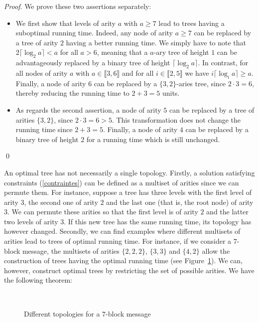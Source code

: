 \documentclass{llncs}
\renewenvironment{proof}{\paragraph{Proof} }{\hfill\qed}
\renewcommand{\paragraph}[1]{\noindent\textit{#1}.}
\begin{document}
\begin{proof}
We prove these two assertions separately:
\begin{itemize}
 \item We first show that levels of arity $a$ with $a \geq 7$ lead to trees having a suboptimal running time.
Indeed, any node of arity $a \geq 7$ can be replaced by a tree of arity $2$ having a better running time. 
We simply have to note that $2\lceil \log_2 a \rceil < a$ for all $a>6$, meaning that
a $a$-ary tree of height $1$ can be advantageously replaced by a binary tree of height $\lceil \log_2 a \rceil$. 
In contrast, for all nodes of arity $a$ with $a \in \llbracket 3, 6 \rrbracket$ and for all $i \in \llbracket 2,5 \rrbracket$ 
we have $i\lceil \log_i a \rceil \geq a$. 
Finally, a node of arity $6$ can be replaced by a $\{3,2\}$-aries tree, since $2 \cdot 3 = 6$,
thereby reducing the running time to $2+3 = 5$ units. 
 \item As regards the second assertion, a node of arity $5$ can be replaced by a tree of arities $\{3, 2\}$, since $2 \cdot 3 = 6 > 5$. 
This transformation does not
change the running time since $2+3 = 5$. Finally, a node of arity $4$ can be replaced by a binary tree of height $2$ for a running time
which is still unchanged.
\end{itemize}
\end{proof}

An optimal tree has not necessarily a single topology. Firstly, a solution satisfying constraints
(\ref{contraintes}) can be defined as a multiset of arities since we can permute them.
For instance, suppose a tree has three levels with the first level of arity $3$, the second one of arity $2$ and the last one (that is, the root node) 
of arity $3$. We can permute these arities so that the first level is of arity $2$ and the latter two levels of arity $3$. 
If this new tree has the same running time, its topology has however changed.
Secondly, we can find examples where different multisets of arities lead to trees of optimal running time. For instance, if we consider a $7$-block message, 
the multisets of arities $\{2, 2, 2\}$, $\{3, 3\}$ and $\{4, 2\}$ allow the construction of trees having the optimal running time (see 
Figure~\ref{Same_running_time_different_trees}).
We can, however, construct optimal trees by restricting the set of possible arities. We have the following theorem:


\begin{figure}[t!]
\centering
{}
~~~~~~~~~~


\vspace{0.75cm}
\caption{Different topologies for a $7$-block message}
\label{Same_running_time_different_trees}
\end{figure}
\end{document}
